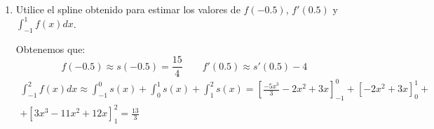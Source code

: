 \begin{ejercicio}
\begin{enumerate}
        \item Utilice el spline obtenido para estimar los valores de $f(-0.5)$, $f'(0.5)$ y $\int_{-1}^1 f(x)dx$.

        Obtenemos que:
        \begin{equation*}
            f(-0.5)\approx s(-0.5)=\frac{15}{4}\qquad f'(0.5)\approx s'(0.5)-4
        \end{equation*}
        \begin{multline*}
            \int_{-1}^2f(x)dx \approx \int_{-1}^0 s(x) + \int_{0}^1 s(x) + \int_{1}^2 s(x) = \left[\frac{-5x^3}{3} -2x^2 +3x\right]_{-1}^0
            + \left[-2x^2+3x\right]_{0}^1 +\\+ \left[3x^3-11x^2+12x\right]_{1}^2
            = \frac{13}{3}
        \end{multline*}
    \end{enumerate}
\end{ejercicio}

